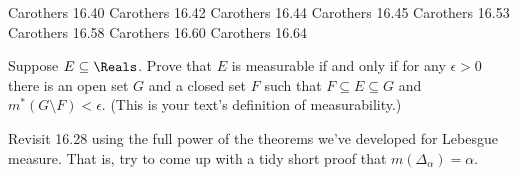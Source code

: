 \documentclass[minion]{homework}
\begin{document}
\begin{aproblems}


\hproblem Carothers 16.40
\hproblem Carothers 16.42
\hproblem Carothers 16.44
\hproblem Carothers 16.45
\hproblem Carothers 16.53
\hproblem Carothers 16.58
\hproblem Carothers 16.60
\hproblem Carothers 16.64

\hproblem Suppose $E\subseteq \Reals$.  Prove that $E$ is measurable
if and only if for any $\epsilon>0$ there is an open set $G$ and a closed 
set $F$ such that $F\subseteq E\subseteq G$ and $m^*(G\setminus F)<\epsilon$.
(This is your text's definition of measurability.)

\hproblem Revisit 16.28 using the full power of the theorems we've developed for
Lebesgue measure.  That is, try to come up with a tidy short proof that $m(\Delta_\alpha)=\alpha$.



\end{aproblems}
\end{document}
